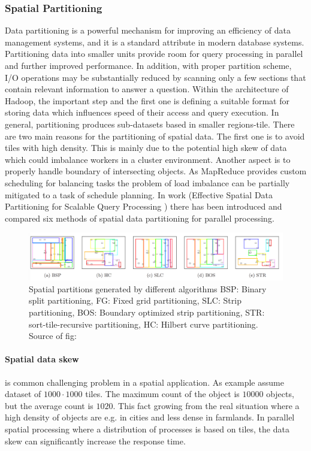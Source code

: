 \documentclass[a4paper,12pt,oneside]{report}
\begin{document}
	\subsubsection{Spatial Partitioning}
	\label{Spatial_Data_Partitioning}
	Data partitioning is a powerful mechanism for improving an efficiency of data
	management systems, 
	and it is a standard attribute in modern database systems. Partitioning data
	into smaller units provide room for query processing in parallel and further
	improved performance. In addition,
	with proper partition scheme, I/O operations may be substantially
	reduced by scanning only a few sections that contain relevant information to
	answer a question.
	Within the architecture of Hadoop, the important step and the first one is defining a
	suitable format for 
	storing data which influences  speed of their access and query execution.
	In general,
	partitioning produces sub-datasets based in smaller regions-tile.
	There are two main reasons for the partitioning of spatial data. 
	The first one is to avoid tiles with high density. This is mainly due to the
	potential high 
	skew\cite{spatial_skew} of data which could imbalance workers in a cluster
	environment. Another aspect is to  
	properly handle boundary of intersecting objects. As MapReduce provides custom
	scheduling  for balancing tasks the problem of load imbalance can be partially 
	mitigated to a task of schedule planning. In work (Effective Spatial Data
	Partitioning for Scalable Query 
	Processing \cite{partitioning}) there has been introduced and compared six methods of
	spatial data partitioning for parallel processing. 
	
	\begin{figure}[h!]
		\centering
		\includegraphics[width=1\textwidth]{./img/part_overview.png}
		\caption[mapreduce flow]{\centering  Spatial partitions generated by
			different algorithms BSP: Binary split 
			partitioning, FG: Fixed grid
			partitioning, SLC: Strip partitioning, BOS: Boundary optimized strip
			partitioning, STR: sort-tile-recursive
			partitioning, HC: Hilbert curve partitioning. Source of fig:
			\cite{partitioning}}
	\end{figure} 
	
	\paragraph{Spatial data skew} is common challenging problem in a spatial
	application. As example \cite{hadoopGIS} assume dataset of 
	$1000\cdot1000$ tiles. The maximum count of the object is $10 000$ objects, but
	the average count is $1020$. This 
	fact growing from the real situation where a high density of objects are e.g. in
	cities and less dense in farmlands. 
	In parallel spatial processing where a distribution of processes is based on
	tiles, the data skew can significantly 
	increase the response time.
	
\end{document}
